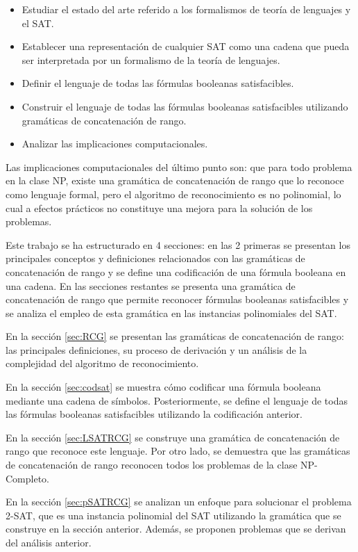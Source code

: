 \documentclass{article}
\begin{document}
\begin{itemize}
    \item Estudiar el estado del arte referido a los formalismos de teoría de lenguajes y el SAT.
    \item Establecer una representación de cualquier SAT como una cadena que pueda ser interpretada por un formalismo de la teoría de lenguajes.
    \item Definir el lenguaje de todas las fórmulas booleanas satisfacibles.
    \item Construir el lenguaje de todas las fórmulas booleanas satisfacibles  utilizando gramáticas de concatenación de rango.
    \item Analizar las implicaciones computacionales.
\end{itemize}

Las implicaciones computacionales del último punto son: que para todo problema en la clase NP, existe una gramática
de concatenación de rango que lo reconoce como lenguaje formal, pero el algoritmo de reconocimiento es no
polinomial, lo cual a efectos prácticos no constituye una mejora para la solución de los problemas.

Este trabajo se ha estructurado en 4 secciones: en las 2 primeras se presentan los principales conceptos y definiciones
relacionados con las gramáticas de concatenación de rango y se define una codificación de una fórmula booleana en una cadena.
En las secciones restantes se presenta una gramática de concatenación de rango que permite reconocer fórmulas booleanas satisfacibles
y se analiza el empleo de esta gramática en las instancias polinomiales del SAT.

En la sección \ref{sec:RCG} se presentan las gramáticas de concatenación de rango: las principales definiciones,
su proceso de derivación y un análisis de la complejidad del algoritmo de reconocimiento.

En la sección \ref{sec:codsat} se muestra cómo codificar una fórmula booleana mediante una cadena de símbolos. Posteriormente,
se define el lenguaje de todas las fórmulas booleanas satisfacibles utilizando la codificación anterior.

En la sección \ref{sec:LSATRCG} se construye una gramática de concatenación
de rango que reconoce este lenguaje. Por otro lado, se demuestra que las gramáticas de concatenación de rango
reconocen todos los problemas de la clase NP-Completo.

En la sección \ref{sec:pSATRCG} se analizan un enfoque para solucionar el problema 2-SAT, que es una instancia
polinomial del SAT utilizando la gramática que se construye en la sección anterior. Además, se proponen
problemas que se derivan del análisis anterior.
\end{document}
